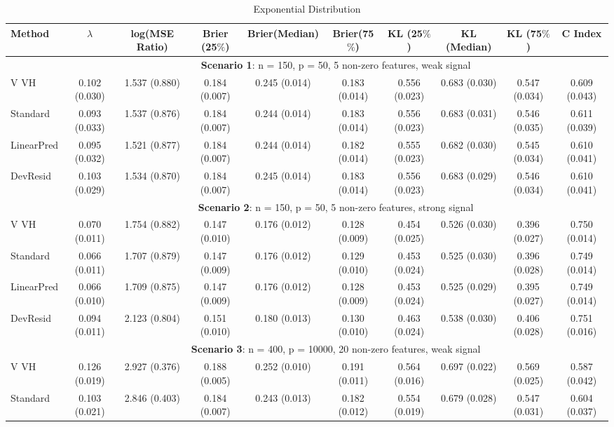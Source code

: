 \documentclass{article}
\begin{document}
\begin{landscape}
\begin{table}[h]
\caption{\label{Tab:exp} Exponential Distribution}
\centering
\begin{tabular}[t]{lccccccccc}
\toprule
 Method & $\lambda$ & log(MSE Ratio) & Brier (25$\%$) & Brier(Median) & Brier(75$\%$) & KL (25$\%$)& KL (Median) & KL (75$\%$) & C Index\\
\midrule
&\multicolumn{9}{c}{\textbf{Scenario 1}: n = 150, p = 50, 5 non-zero features, weak signal}\\
\cline{2-10}
V VH  & 0.102 (0.030) & 1.537 (0.880) & 0.184 (0.007) & 0.245 (0.014) & 0.183 (0.014) & 0.556 (0.023) & 0.683 (0.030) & 0.547 (0.034) & 0.609 (0.043) \\    
Standard  & 0.093 (0.033) & 1.537 (0.876) & 0.184 (0.007) & 0.244 (0.014) & 0.183 (0.014) & 0.556 (0.023) & 0.683 (0.031) & 0.546 (0.035) & 0.611 (0.039) \\    
LinearPred  & 0.095 (0.032) & 1.521 (0.877) & 0.184 (0.007) & 0.244 (0.014) & 0.182 (0.014) & 0.555 (0.023) & 0.682 (0.030) & 0.545 (0.034) & 0.610 (0.041) \\    
DevResid  & 0.103 (0.029) & 1.534 (0.870) & 0.184 (0.007) & 0.245 (0.014) & 0.183 (0.014) & 0.556 (0.023) & 0.683 (0.029) & 0.546 (0.034) & 0.610 (0.041) \\
\addlinespace
&\multicolumn{9}{c}{\textbf{Scenario 2}: n = 150, p = 50, 5 non-zero features, strong signal}\\
\cline{2-10}
 V VH  & 0.070 (0.011) & 1.754 (0.882) & 0.147 (0.010) & 0.176 (0.012) & 0.128 (0.009) & 0.454 (0.025) & 0.526 (0.030) & 0.396 (0.027) & 0.750 (0.014) \\  
 Standard  & 0.066 (0.011) & 1.707 (0.879) & 0.147 (0.009) & 0.176 (0.012) & 0.129 (0.010) & 0.453 (0.024) & 0.525 (0.030) & 0.396 (0.028) & 0.749 (0.014) \\   
 LinearPred  & 0.066 (0.010) & 1.709 (0.875) & 0.147 (0.009) & 0.176 (0.012) & 0.128 (0.009) & 0.453 (0.024) & 0.525 (0.029) & 0.395 (0.027) & 0.749 (0.014) \\  
 DevResid  & 0.094 (0.011) & 2.123 (0.804) & 0.151 (0.010) & 0.180 (0.013) & 0.130 (0.010) & 0.463 (0.024) & 0.538 (0.030) & 0.406 (0.028) & 0.751 (0.016) \\
\addlinespace
&\multicolumn{9}{c}{\textbf{Scenario 3}: n = 400, p = 10000, 20 non-zero features, weak signal}\\
\cline{2-10}
 V VH  & 0.126 (0.019) & 2.927 (0.376) & 0.188 (0.005) & 0.252 (0.010) & 0.191 (0.011) & 0.564 (0.016) & 0.697 (0.022) & 0.569 (0.025) & 0.587 (0.042) \\
 Standard  & 0.103 (0.021) & 2.846 (0.403) & 0.184 (0.007) & 0.243 (0.013) & 0.182 (0.012) & 0.554 (0.019) & 0.679 (0.028) & 0.547 (0.031) & 0.604 (0.037) \\

\end{tabular}
\end{table}
\end{landscape}
\end{document}
